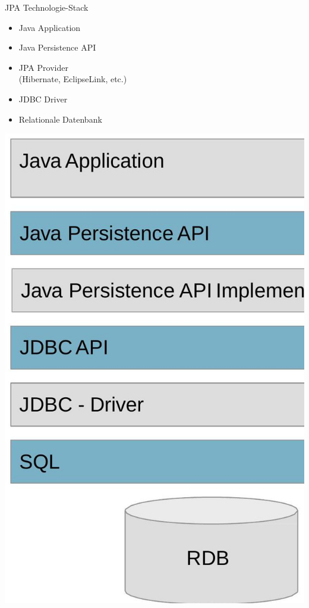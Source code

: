 \begin{concept}{JPA Technologie-Stack}

\begin{minipage}[b]{0.45\textwidth}
\begin{itemize}
    \item Java Application
    \item Java Persistence API
    \item JPA Provider \\(Hibernate, EclipseLink, etc.)
    \item JDBC Driver
    \item Relationale Datenbank
\end{itemize}
\end{minipage}
\hspace{4mm}
\begin{minipage}{0.45\textwidth}
\includegraphics[width=0.8\linewidth]{images/2025_01_02_5ba1dc702e9f94ba8e06g-29.jpg}
\end{minipage}
\end{concept}

